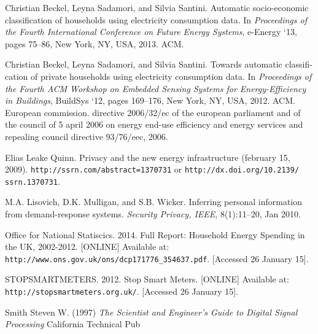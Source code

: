 \documentclass[12pt,a4paper]{article}
\begin{document}
\begin{thebibliography}{9}

 Christian Beckel, Leyna Sadamori, and Silvia Santini. Automatic socio-economic classification of households using electricity consumption data. In {\em Proceedings of the Fourth International Conference on Future Energy Systems}, e-Energy `13, pages 75–86, New York, NY, USA, 2013. ACM.

 Christian Beckel, Leyna Sadamori, and Silvia Santini. Towards automatic classifi- cation of private households using electricity consumption data. In {\em Proceedings of the Fourth ACM Workshop on Embedded Sensing Systems for Energy-Efficiency in Buildings}, BuildSys `12, pages 169–176, New York, NY, USA, 2012. ACM.
 European commission. directive 2006/32/ec of the european parliament and of the council of 5 april 2006 on energy end-use efficiency and energy services and repealing council directive 93/76/eec, 2006.

 Elias Leake Quinn. Privacy and the new energy infrastructure (february 15, 2009). \texttt{http://ssrn.com/abstract=1370731} or \texttt{http://dx.doi.org/10.2139/ ssrn.1370731}.

 M.A. Lisovich, D.K. Mulligan, and S.B. Wicker. Inferring personal information from demand-response systems. \textit{Security Privacy, IEEE}, 8(1):11–20, Jan 2010.

 Office for National Statiscics. 2014. Full Report: Household Energy Spending in the UK, 2002-2012. [ONLINE] Available at: \texttt{http://www.ons.gov.uk/ons/dcp171776\_354637.pdf}. [Accessed 26 January 15].

STOPSMARTMETERS. 2012. Stop Smart Meters. [ONLINE] Available at: \texttt{http://stopsmartmeters.org.uk/}. [Accessed 26 January 15].

 Smith Steven W. (1997) \textit{The Scientist and Engineer's Guide to Digital Signal Processing} California Technical Pub
\end{thebibliography}
\end{document}

